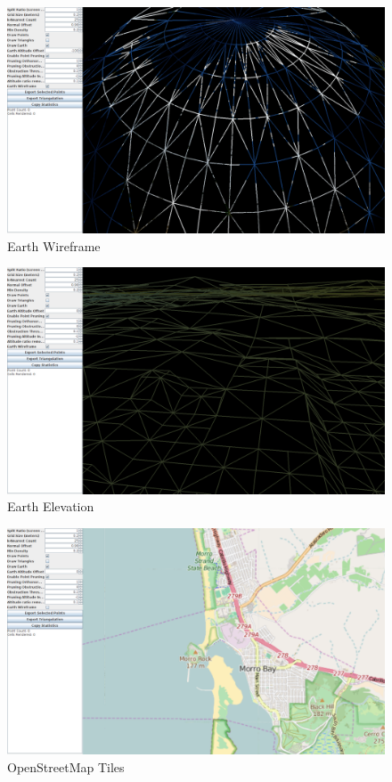 \begin{figure}[htp]
\begin{center}
  \includegraphics[width=.75\linewidth]{images/earthlod.png}
  \caption{Earth Wireframe}
  \label{fig:earthWire}
\end{center}
\end{figure}

\begin{figure}[htp]
\begin{center}
  \includegraphics[width=.75\linewidth]{images/earthElevation.png}
  \caption{Earth Elevation}
  \label{fig:earthDEM}
\end{center}
\end{figure}

\begin{figure}[htp]
\begin{center}
  \includegraphics[width=.75\linewidth]{images/earthTiles.png}
  \caption{OpenStreetMap Tiles}
  \label{fig:earthTiles}
\end{center}
\end{figure}

